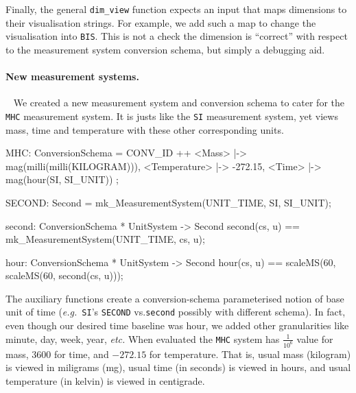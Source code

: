\documentclass[runningheads,a4paper]{llncs}
\begin{document}
Finally, the general \texttt{dim\_view} function expects an input that maps dimensions to their visualisation strings. For example, we add such a map to change the visualisation into \texttt{BIS}. This is not a check the dimension is ``correct'' with respect to the measurement system conversion schema, but simply a debugging aid.     

\paragraph*{New measurement systems.}~
%
We created a new measurement system and conversion schema to cater for the  \texttt{MHC} measurement system. It is justs like the \texttt{SI} measurement system, yet views mass, time and temperature with these other corresponding units.
%
\begin{vdmsl}[frame=none,basicstyle=\ttfamily\scriptsize]
    MHC: ConversionSchema = CONV_ID ++ 
        { <Mass> |-> mag(milli(milli(KILOGRAM))), <Temperature> |-> -272.15,
          <Time> |-> mag(hour(SI, SI_UNIT)) };

    SECOND: Second = mk_MeasurementSystem(UNIT_TIME, SI, SI_UNIT);

    second: ConversionSchema * UnitSystem -> Second
    second(cs, u) == mk_MeasurementSystem(UNIT_TIME, cs, u);
    
    hour: ConversionSchema * UnitSystem -> Second 
    hour(cs, u) == scaleMS(60, scaleMS(60, second(cs, u)));      
\end{vdmsl}
%
\noindent The auxiliary functions create a conversion-schema parameterised notion of base unit of time (\textit{e.g.}~\texttt{SI}'s \texttt{SECOND} vs.\@ \texttt{second} possibly with different schema). In fact, even though our desired time baseline was hour, we added other granularities like minute, day, week, year, \textit{etc.} When evaluated the \texttt{MHC} system has \(\frac{1}{10^6}\) value for mass, \(3600\) for time, and \(-272.15\) for temperature. That is, usual mass (kilogram) is viewed in miligrams (mg), usual time (in seconds) is viewed in hours, and usual temperature (in kelvin) is viewed in centigrade.
\end{document}
